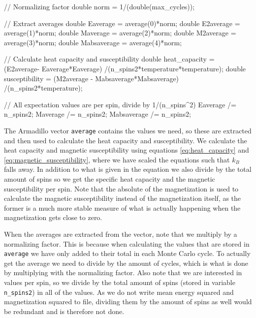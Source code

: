 \documentclass[reprint,english,notitlepage]{revtex4-1}  %
\begin{document}
\begin{cpp}
// Normalizing factor
double norm = 1/(double(max_cycles));

// Extract averages
double Eaverage = average(0)*norm;
double E2average = average(1)*norm;
double Maverage = average(2)*norm;
double M2average = average(3)*norm;
double Mabsaverage = average(4)*norm;

// Calculate heat capacity and susceptibility
double heat_capacity = (E2average- Eaverage*Eaverage)
					   /(n_spins2*temperature*temperature);
double susceptibility = (M2average - Mabsaverage*Mabsaverage)
					    /(n_spins2*temperature);

// All expectation values are per spin, divide by 1/(n_spins^2)
Eaverage /= n_spins2;
Maverage /= n_spins2;
Mabsaverage /= n_spins2;
\end{cpp}

The Armadillo \citep{Armadillo} vector \verb+average+ contains the values we need, so these are extracted and then used to calculate the heat capacity and susceptibility. We calculate the heat capacity and magnetic susceptibility using equations \eqref{eq:heat_capacity} and \eqref{eq:magnetic_susceptibility}, where we have scaled the equations such that $k_B$ falls away. In addition to what is given in the equation we also divide by the total amount of spins so we get the specific heat capacity and the magnetic susceptibility per spin. Note that the absolute of the magnetization is used to calculate the magnetic susceptibility instead of the magnetization itself, as the former is a much more stable measure of what is actually happening when the magnetization gets close to zero.

When the averages are extracted from the vector, note that we multiply by a normalizing factor. This is because when calculating the values that are stored in \verb+average+ we have only added to their total in each Monte Carlo cycle. To actually get the average we need to divide by the amount of cycles, which is what is done by multiplying with the normalizing factor. Also note that we are interested in values per spin, so we divide by the total amount of spins (stored in variable \verb+n_spins2+) in all of the values. As we do not write mean energy squared and magnetization squared to file, dividing them by the amount of spins as well would be redundant and is therefore not done.
\end{document}
